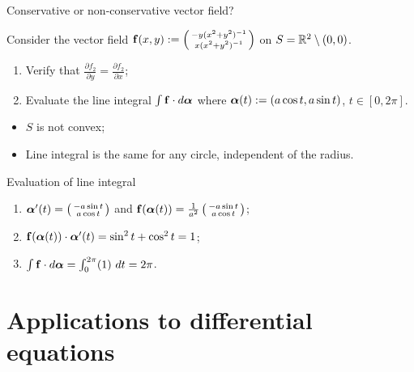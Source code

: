 {Conservative or non-conservative vector field?}


\begin{example}
    Consider the vector field \(\mathbf{f}(x,y) := \left(\begin{smallmatrix}
        -y (x^2 + y^2)^{-1} \\ x (x^2 + y^2)^{-1}
    \end{smallmatrix}\right)\)
    on \(S = \mathbb{R}^2 \setminus (0,0)\).
    \begin{enumerate}
        \item Verify that \(  \tfrac{\partial f_2}{\partial y} = \tfrac{\partial f_2}{\partial x}\);
        \item Evaluate the line integral \(\int \mathbf{f} \cdot d\boldsymbol{\alpha}\) where \(\boldsymbol{\alpha}(t) := (a \cos t, a \sin t)\), \(t\in [0,2\pi]\).
    \end{enumerate}

\end{example}


\begin{itemize}
    \item \(S\) is not convex;
    \item Line integral is the same for any circle, independent of the radius.
\end{itemize}


{Evaluation of line integral}


\begin{enumerate}
    \item \(\boldsymbol{\alpha}'(t) = \left(\begin{smallmatrix}
                  -a \sin t \\ a \cos t
              \end{smallmatrix}\right)\) and \(\mathbf{f}(\boldsymbol{\alpha}(t)) = \frac{1}{a^2} \left(\begin{smallmatrix}
                  -a \sin t \\ a \cos t
              \end{smallmatrix}\right)   \);
    \item \(\mathbf{f}(\boldsymbol{\alpha}(t)) \cdot \boldsymbol{\alpha}'(t) = \sin^2 t + \cos^2 t = 1  \);
    \item \(\int \mathbf{f} \cdot d\boldsymbol{\alpha} = \int_{0}^{2\pi} (1) \ dt = 2\pi \).
\end{enumerate}



\section{Applications to differential equations}



